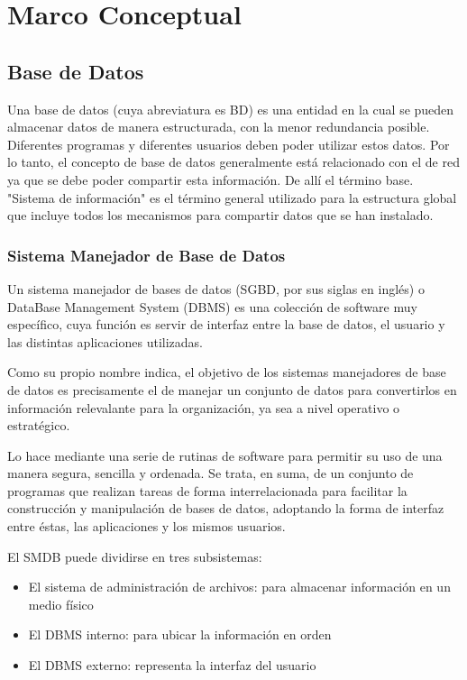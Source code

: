 \chapter{Marco Conceptual}


\section{Base de Datos} 	
\setlength{\parskip}{5mm}
Una base de datos (cuya abreviatura es BD) es una entidad en la cual se pueden almacenar datos de manera estructurada, con la menor redundancia posible. Diferentes programas y diferentes usuarios deben poder utilizar estos datos. Por lo tanto, el concepto de base de datos generalmente está relacionado con el de red ya que se debe poder compartir esta información. De allí el término base. "Sistema de información" es el término general utilizado para la estructura global que incluye todos los mecanismos para compartir datos que se han instalado.


\citet{bdbib} 


\setlength{\parskip}{0mm}



\subsection{Sistema Manejador de Base de Datos}
\setlength{\parskip}{5mm}
Un sistema manejador de bases de datos (SGBD, por sus siglas en inglés) o DataBase Management System (DBMS) es una colección de software muy específico, cuya función es servir de interfaz entre la base de datos, el usuario y las distintas aplicaciones utilizadas.

Como su propio nombre indica, el objetivo de los sistemas manejadores de base de datos es precisamente el de manejar un conjunto de datos para convertirlos en información relevalante para la organización, ya sea a nivel operativo o estratégico.
 
Lo hace mediante una serie de rutinas de software para permitir su uso de una manera segura, sencilla y ordenada. Se trata, en suma, de un conjunto de programas que realizan tareas de forma interrelacionada para facilitar la construcción y manipulación de bases de datos, adoptando la forma de interfaz entre éstas, las aplicaciones y los mismos usuarios.

El SMDB puede dividirse en tres subsistemas:
\setlength{\parskip}{0mm}
\begin{itemize}

    \item El sistema de administración de archivos: para almacenar información en un medio físico
    
    \item El DBMS interno: para ubicar la información en orden
    
    \item El DBMS externo: representa la interfaz del usuario

\end{itemize}

